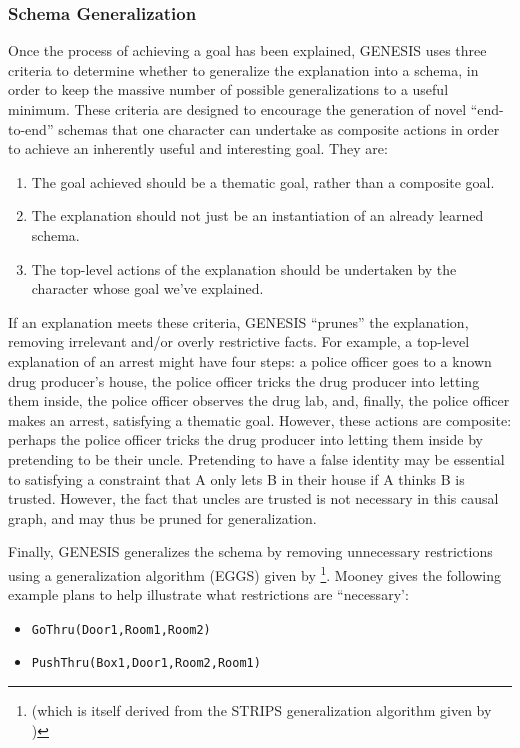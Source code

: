 \subsubsection{Schema Generalization}

Once the process of achieving a goal has been explained, GENESIS uses three criteria to determine whether to generalize the explanation into a schema, in order to keep the massive number of possible generalizations to a useful minimum. These criteria are designed to encourage the generation of novel ``end-to-end'' schemas that one character can undertake as composite actions in order to achieve an inherently useful and interesting goal. They are:

\begin{enumerate}
    \item The goal achieved should be a thematic goal, rather than a composite goal.
    \item The explanation should not just be an instantiation of an already learned schema.
    \item The top-level actions of the explanation should be undertaken by the character whose goal we've explained.
\end{enumerate}

If an explanation meets these criteria, GENESIS ``prunes'' the explanation, removing irrelevant and/or overly restrictive facts. For example, a top-level explanation of an arrest might have four steps: a police officer goes to a known drug producer's house, the police officer tricks the drug producer into letting them inside, the police officer observes the drug lab, and, finally, the police officer makes an arrest, satisfying a thematic goal. However, these actions are composite: perhaps the police officer tricks the drug producer into letting them inside by pretending to be their uncle. Pretending to have a false identity may be essential to satisfying a constraint that A only lets B in their house if A thinks B is trusted. However, the fact that uncles are trusted is not necessary in this causal graph, and may thus be pruned for generalization.

Finally, GENESIS generalizes the schema by removing unnecessary restrictions using a generalization algorithm (EGGS) given by \citep{mooney:phd88} \footnote{(which is itself derived from the STRIPS generalization algorithm given by \citep{fikes1972})}. Mooney gives the following example plans to help illustrate what restrictions are ``necessary':

\begin{itemize}
    \item \texttt{GoThru(Door1,Room1,Room2)}
    \item \texttt{PushThru(Box1,Door1,Room2,Room1)}
\end{itemize}


